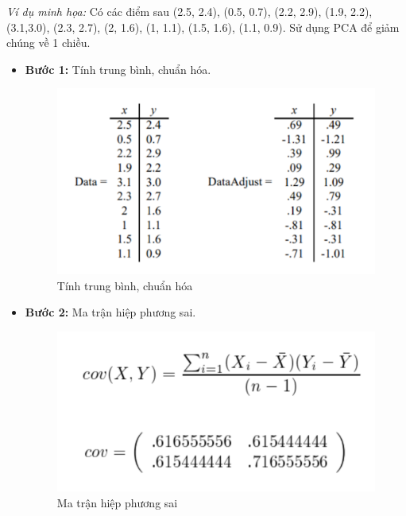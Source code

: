 \textit{Ví dụ minh họa:}
Có các điểm sau (2.5, 2.4), (0.5, 0.7), (2.2, 2.9), (1.9, 2.2), (3.1,3.0), (2.3, 2.7), (2, 1.6), (1, 1.1), (1.5, 1.6), (1.1, 0.9). Sử dụng PCA để giảm chúng về 1 chiều.
\begin{itemize}
    \item \textbf{Bước 1:} Tính trung bình, chuẩn hóa.
    \begin{figure}[H]
        \begin{center}
            \includegraphics[scale=0.7]{images/theo2/PCA-cal-1}
            \caption{Tính trung bình, chuẩn hóa}
        \end{center}
    \end{figure}

    \item \textbf{Bước 2:} Ma trận hiệp phương sai.
    \begin{figure}[H]
        \begin{center}
            \includegraphics[scale=0.4]{images/theo2/PCA-cal-2}
            \caption{Ma trận hiệp phương sai}
        \end{center}
    \end{figure}


\end{itemize}
